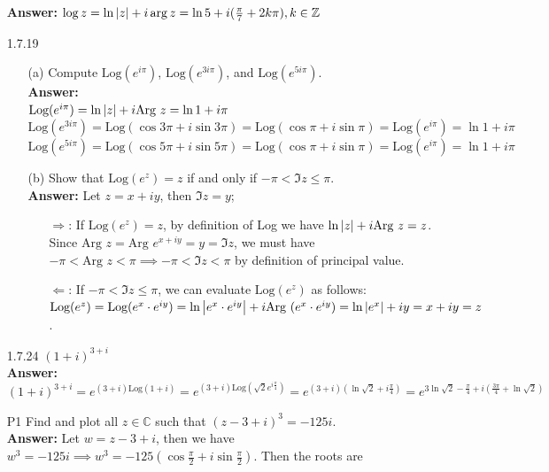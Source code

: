 \documentclass{article}
\begin{document}
\begin{itemize}
          \textbf{Answer: } $\log z=\ln\abs{z}+i\arg z=\ln 5+i(\frac{\pi}{7}+2k\pi), k\in\mathbb{Z}$
    \item [1.7.19]
          \begin{itemize}
              \item [(a)] Compute $\text{Log}(e^{i\pi})$, $\text{Log}(e^{3i\pi})$, and $\text{Log}(e^{5i\pi})$.\\
                    \textbf{Answer: }\\
                    $\text{Log}(e^{i\pi})=\ln\abs{z}+i\text{Arg }z=\ln 1+i\pi$\\
                    $\text{Log}(e^{3i\pi})=\text{Log}(\cos 3\pi+i\sin 3\pi)=\text{Log}(\cos\pi+i\sin\pi)=\text{Log}(e^{i\pi})=\ln 1+i\pi$\\
                    $\text{Log}(e^{5i\pi})=\text{Log}(\cos 5\pi+i\sin 5\pi)=\text{Log}(\cos\pi+i\sin\pi)=\text{Log}(e^{i\pi})=\ln 1+i\pi$
              \item [(b)] Show that $\text{Log}(e^z)=z$ if and only if $-\pi<\Im z\leq\pi$.\\
                    \textbf{Answer: } Let $z=x+iy$, then $\Im z=y$;
                    \begin{itemize}
                        \item [$\Rightarrow$:] If $\text{Log}(e^z)=z$, by definition of Log we have $\ln\abs{z}+i\text{Arg }z=z$. Since $\text{Arg }z=\text{Arg }e^{x+iy}=y=\Im z$, we must have $-\pi<\text{Arg }z<\pi\implies -\pi<\Im z<\pi$ by definition of principal value.
                        \item [$\Leftarrow$:] If $-\pi<\Im z\leq\pi$, we can evaluate $\text{Log}(e^z)$ as follows: $\text{Log}(e^z)=\text{Log}(e^x\cdot e^{iy})=\ln\abs{e^x\cdot e^{iy}}+i\text{Arg }(e^x\cdot e^{iy})=\ln\abs{e^x}+iy=x+iy=z$.
                    \end{itemize} 
          \end{itemize}
    \item [1.7.24] $(1+i)^{3+i}$\\
          \textbf{Answer: } $(1+i)^{3+i}=e^{(3+i)\text{Log}(1+i)}=e^{(3+i)\text{Log}(\sqrt{2}e^{i\frac{\pi}{4}})}=e^{(3+i)(\ln\sqrt{2}+i\frac{\pi}{4})}=e^{3\ln\sqrt{2}-\frac{\pi}{4}+i(\frac{3\pi}{4}+\ln\sqrt{2})}$
    \item [P1] Find and plot all $z\in\mathbb{C}$ such that $(z-3+i)^3=-125i$.\\
          \textbf{Answer: } Let $w=z-3+i$, then we have $w^3=-125i\implies w^3=-125(\cos\frac{\pi}{2}+i\sin\frac{\pi}{2})$. Then the roots are\\

\end{itemize}
\end{document}
